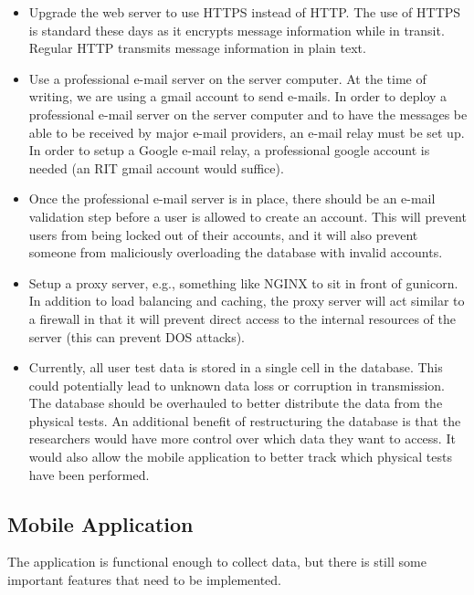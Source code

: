 \documentclass[conference]{IEEEtran}
\begin{document}
\begin{itemize}
    \item Upgrade the web server to use HTTPS instead of HTTP. The use of HTTPS is standard these days as it encrypts message information while in transit. Regular HTTP transmits message information in plain text.
    \item Use a professional e-mail server on the server computer. At the time of writing, we are using a gmail account to send e-mails. In order to deploy a professional e-mail server on the server computer and to have the messages be able to be received by major e-mail providers, an e-mail relay must be set up. In order to setup a Google e-mail relay, a professional google account is needed (an RIT gmail account would suffice).
    \item Once the professional e-mail server is in place, there should be an e-mail validation step before a user is allowed to create an account. This will prevent users from being locked out of their accounts, and it will also prevent someone from maliciously overloading the database with invalid accounts.
    \item Setup a proxy server, e.g., something like NGINX to sit in front of gunicorn. In addition to load balancing and caching, the proxy server will act similar to a firewall in that it will prevent direct access to the internal resources of the server (this can prevent DOS attacks).
    \item Currently, all user test data is stored in a single cell in the database. This could potentially lead to unknown data loss or corruption in transmission. The database should be overhauled to better distribute the data from the physical tests. An additional benefit of restructuring the database is that the researchers would have more control over which data they want to access. It would also allow the mobile application to better track which physical tests have been performed.
\end{itemize}

\subsection{Mobile Application}

The application is functional enough to collect data, but there is still some important features that need to be implemented. 
\end{document}
